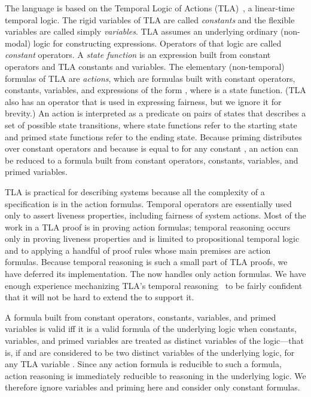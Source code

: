 \documentclass[a4paper]{easychair}
\begin{document}
The \tlaplus language is based on the Temporal Logic of Actions
(TLA)~\cite{lamport:newtla}, a linear-time temporal logic. The rigid
variables of TLA are called \emph{constants} and the flexible
variables are called simply \emph{variables}.  TLA assumes an
underlying ordinary (non-modal) logic for constructing expressions.
Operators of that logic are called \emph{constant} operators.  A
\emph{state function} is an expression built from constant operators
and TLA constants and variables.  The elementary (non-temporal)
formulas of TLA are \textit{actions}, which are formulas built with
constant operators, constants, variables, and expressions of the form
, where  is a state function.  (TLA also has an \ENABLED
operator that is used in expressing fairness, but we ignore it
for brevity.)  An action is interpreted as a predicate on pairs of
states that describes a set of possible state transitions, where state
functions refer to the starting state and primed state functions refer
to the ending state.  Because priming distributes over constant
operators and because  is equal to  for any constant , an
action can be reduced to a formula built from constant operators,
constants, variables, and primed variables.

TLA is practical for describing systems because all the complexity of
a specification is in the action formulas.  Temporal operators are
essentially used only to assert liveness properties, including
fairness of system actions.  Most of the work in a TLA proof is in
proving action formulas; temporal reasoning occurs only in proving
liveness properties and is limited to propositional temporal logic and
to applying a handful of proof rules whose main premises are action
formulas.  Because temporal reasoning is such a small part of TLA
proofs, we have deferred its implementation.  The \PM now handles
only action formulas.  We have enough experience mechanizing TLA's
temporal reasoning~\cite{engberg:mechanical} to be fairly confident
that it will not be hard to extend the \PM to support it.

A formula built from constant operators, constants, variables, and
primed variables is valid iff it is a valid formula of the underlying
logic when constants, variables, and primed variables are treated as
distinct variables of the logic---that is, if  and  are
considered to be two distinct variables of the underlying logic, for
any TLA variable .  Since any action formula is reducible to such a
formula, action reasoning is immediately reducible to reasoning in the
underlying logic.  We therefore ignore variables and priming here and
consider only constant formulas.
\end{document}
